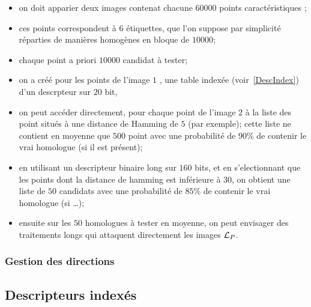 \begin{itemize}
   \item  on doit apparier deux images contenat chacune $60 000$ points caract\'eristiques ;
   \item  ces points correspondent \`a $6$ \'etiquettes, que l'on suppose par simplicit\'e r\'eparties de
          mani\`eres homog\`enes en bloque de $10000$;

   \item  chaque point a priori $10000$ candidat \`a tester; 
  
   \item  on a  cr\'e\'e pour les points de l'image $1$ , une table index\'ee (voir~\ref{DescIndex}) 
          d'un descrpteur sur $20$ bit,

   \item on peut acc\'eder directement, pour chaque point de l'image $2$ \`a la liste des point situ\'es
         \`a une distance de Hamming de $5$ (par exemple);  cette liste ne contient en moyenne que
         $500$ point avec une probabilit\'e de $90\%$ de contenir le vrai homologue (si il est pr\'esent);
          
   \item en utilisant un descripteur binaire long sur $160$ bits, et en s'electionnant que les points dont
         la distance de hamming est inf\'erieure \`a $30$, on obtient une liste de $50$ candidats 
         avec une probabilit\'e de $85\%$ de contenir le vrai homologue (si \dots);

   \item ensuite sur les $50$ homologues \`a tester en moyenne, on peut envisager des traitements longs
         qui attaquent directement les images ${\mathcal L_P}$.

\end{itemize}

\subsubsection{Gestion des directions}


\subsection{Descripteurs index\'es}

